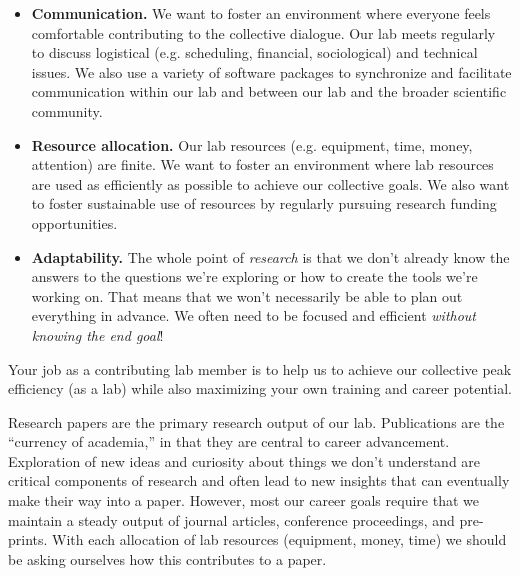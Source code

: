 \documentclass{tufte-book} %
\begin{document}
\begin{itemize}

\item \textbf{Communication.} We want to foster an environment where everyone feels comfortable contributing to the collective dialogue. Our lab meets regularly to discuss logistical (e.g. scheduling, financial,  sociological) and technical issues. We also use a variety of software packages to synchronize and facilitate communication within our lab and between our lab and the broader scientific community.

\item \textbf{Resource allocation.} Our lab resources (e.g. equipment, time, money, attention) are finite. We want to foster an environment where lab resources are used as efficiently as possible to achieve our collective goals. We also want to foster sustainable use of resources by regularly pursuing research funding opportunities.

\item \textbf{Adaptability.} The whole point of \textit{research} is that we don't already know the answers to the questions we're exploring or how to create the tools we're working on. That means that we won't necessarily be able to plan out everything in advance. We often need to be focused and efficient \textit{without knowing the end goal}!
\end{itemize}
Your job as a contributing lab member is to help us to achieve our collective peak efficiency (as a lab) while also maximizing your own training and career potential. 



\noindent Research papers are the primary research output of our lab. Publications are the ``currency of academia,'' in that they are central to career advancement. Exploration of new ideas and curiosity about things we don't understand are critical components of research and often lead to new insights that can eventually make their way into a paper. However, most our career goals require that we maintain a steady output of journal articles, conference proceedings, and pre-prints. With each allocation of lab resources (equipment, money, time) we should be asking ourselves how this contributes to a paper.
\end{document}
